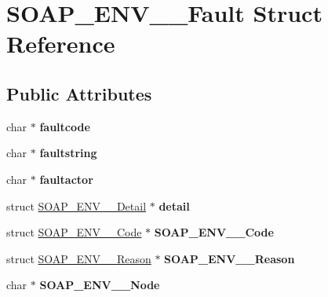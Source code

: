 \hypertarget{structSOAP__ENV____Fault}{
\section{SOAP\_\-ENV\_\-\_\-Fault Struct Reference}
\label{structSOAP__ENV____Fault}
}
\subsection*{Public Attributes}
\begin{DoxyCompactItemize}
\item 
\hypertarget{structSOAP__ENV____Fault_abf3a736463674fb5c5de7b866f444ec5}{
char $\ast$ {\bfseries faultcode}}
\label{structSOAP__ENV____Fault_abf3a736463674fb5c5de7b866f444ec5}

\item 
\hypertarget{structSOAP__ENV____Fault_ac08b3725c7c6b2e9c636995e82876a9a}{
char $\ast$ {\bfseries faultstring}}
\label{structSOAP__ENV____Fault_ac08b3725c7c6b2e9c636995e82876a9a}

\item 
\hypertarget{structSOAP__ENV____Fault_ae4c53ce0884ec757d48c1f62a516edce}{
char $\ast$ {\bfseries faultactor}}
\label{structSOAP__ENV____Fault_ae4c53ce0884ec757d48c1f62a516edce}

\item 
\hypertarget{structSOAP__ENV____Fault_af49c2a1926ebf4c865ddd444960b9adb}{
struct \hyperlink{structSOAP__ENV____Detail}{SOAP\_\-ENV\_\-\_\-Detail} $\ast$ {\bfseries detail}}
\label{structSOAP__ENV____Fault_af49c2a1926ebf4c865ddd444960b9adb}

\item 
\hypertarget{structSOAP__ENV____Fault_acec1784f16ffd14a69a92b92f0ddd15f}{
struct \hyperlink{structSOAP__ENV____Code}{SOAP\_\-ENV\_\-\_\-Code} $\ast$ {\bfseries SOAP\_\-ENV\_\-\_\-Code}}
\label{structSOAP__ENV____Fault_acec1784f16ffd14a69a92b92f0ddd15f}

\item 
\hypertarget{structSOAP__ENV____Fault_a921e9d8c41d62f32ab6d4d39a2e71bc9}{
struct \hyperlink{structSOAP__ENV____Reason}{SOAP\_\-ENV\_\-\_\-Reason} $\ast$ {\bfseries SOAP\_\-ENV\_\-\_\-Reason}}
\label{structSOAP__ENV____Fault_a921e9d8c41d62f32ab6d4d39a2e71bc9}

\item 
\hypertarget{structSOAP__ENV____Fault_a07e508b520e8a1e2c8ba20acf1c2ddd9}{
char $\ast$ {\bfseries SOAP\_\-ENV\_\-\_\-Node}}
\label{structSOAP__ENV____Fault_a07e508b520e8a1e2c8ba20acf1c2ddd9}


\end{DoxyCompactItemize}
